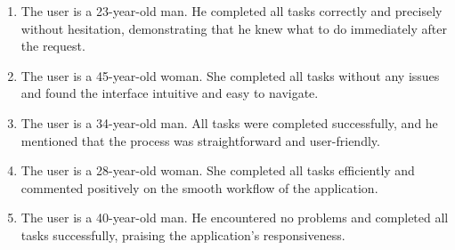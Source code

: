 \documentclass[12pt]{article}
\begin{document}
\begin{enumerate}
    \item The user is a 23-year-old man. He completed all tasks 
    correctly and precisely without hesitation, demonstrating that he knew 
    what to do immediately after the request.

    \item The user is a 45-year-old woman. She completed all tasks 
    without any issues and found the interface intuitive and easy to navigate.

    \item The user is a 34-year-old man. All tasks were completed successfully, and he mentioned that the process was straightforward and user-friendly.

    \item The user is a 28-year-old woman. She completed all tasks 
    efficiently and commented positively on the smooth workflow of the application.

    \item The user is a 40-year-old man. He encountered no problems and completed all tasks successfully, praising the application's responsiveness.
\end{enumerate}
\end{document}
